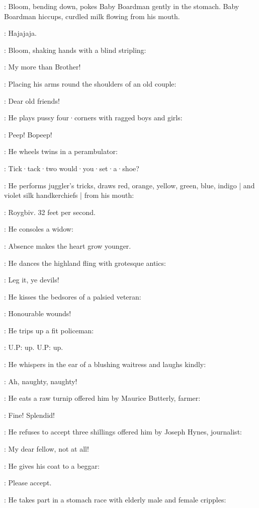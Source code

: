 :
Bloom,
bending down,
pokes Baby Boardman gently in the stomach.
Baby Boardman hiccups,
curdled milk flowing from his mouth.

\BabyBoardman:
Hajajaja.

:
Bloom,
shaking hands with a blind stripling:

\Bloom:
My more than Brother!

:
Placing his arms round the shoulders of an old couple:

\Bloom:
Dear old friends!

:
He plays pussy four·corners with ragged boys and girls:

\Bloom:
Peep!
Bopeep!

:
He wheels twins in a perambulator:

\Bloom:
Tick·tack·two would·you·set·a·shoe?

:
He performs juggler's tricks,
draws red,
orange,
yellow,
green,
blue,
indigo |
and violet silk handkerchiefs |
from his mouth:

\Bloom:
Roygbiv.
32 feet per second.

:
He consoles a widow:

\Bloom:
Absence makes the heart grow younger.

:
He dances the highland fling with grotesque antics:

\Bloom:
Leg it,
ye devils!

:
He kisses the bedsores of a palsied veteran:

\Bloom:
Honourable wounds!

:
He trips up a fit policeman:

\Bloom:
U.P:
up.
U.P:
up.

:
He whispers in the ear of a blushing waitress and laughs kindly:

\Bloom:
Ah,
naughty,
naughty!

:
He eats a raw turnip offered him by Maurice Butterly,
farmer:

\Bloom:
Fine!
Splendid!

:
He refuses to accept three shillings offered him by Joseph Hynes,
journalist:

\Bloom:
My dear fellow,
not at all!

:
He gives his coat to a beggar:

\Bloom:
Please accept.

:
He takes part in a stomach race with elderly male and female cripples:

